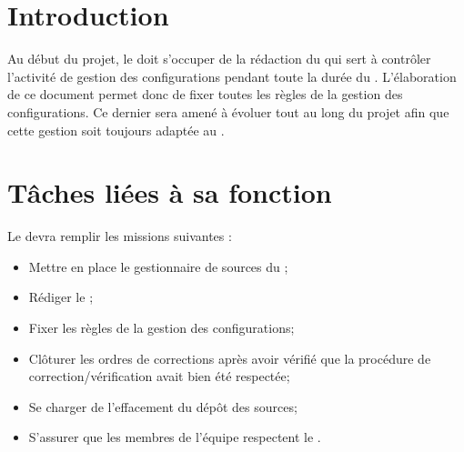 \documentclass[11pt]{article}
\begin{document}
\section*{Introduction}

Au début du projet, le \RGC{} doit s'occuper de la rédaction du \PGCCourt{} qui sert à contrôler l’activité de gestion des configurations pendant toute la durée du \PICCourt. L’élaboration de ce document permet donc de fixer toutes les règles de la gestion des configurations. Ce dernier sera amené à évoluer tout au long du projet afin que cette gestion soit toujours adaptée au \PICCourt.

\section*{Tâches liées à sa fonction}

Le \RGC{} devra remplir les missions suivantes :
\begin{itemize}
	\item Mettre en place le gestionnaire de sources du \PICCourt;
	\item Rédiger le \PGC;
	\item Fixer les règles de la gestion des configurations;
        \item Clôturer les ordres de corrections après avoir vérifié que la procédure de correction/vérification avait bien été respectée;
        \item Se charger de l'effacement du dépôt des sources;
        \item S'assurer que les membres de l'équipe \PICCourt{} respectent le \PGCCourt.
\end{itemize}
\end{document}
